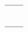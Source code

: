 \documentclass[10pt]{article}
\begin{document}
\begin{table}[h]
  \begin{tabular}{L{12cm} L{8cm}}
     \\
     &  \\
    \sgray{\officeaddr} & \sgray{\homeaddr}\\
    \sgray{\officepostalcode} & \sgray{\homepostalcode}\\
     & \\
     & \\
  \end{tabular}
\end{table}





\end{document}
